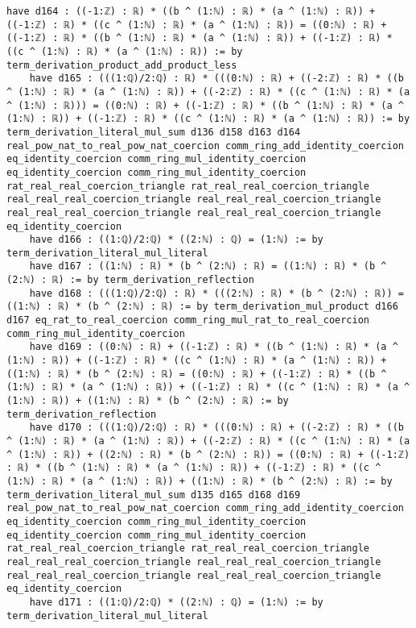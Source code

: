 \documentclass{article}
\begin{document}
\begin{tcolorbox}[colback=white!10, width=\linewidth]
\begin{lstlisting}[language=Lean4]
    have d164 : ((-1:ℤ) : ℝ) * ((b ^ (1:ℕ) : ℝ) * (a ^ (1:ℕ) : ℝ)) + ((-1:ℤ) : ℝ) * ((c ^ (1:ℕ) : ℝ) * (a ^ (1:ℕ) : ℝ)) = ((0:ℕ) : ℝ) + ((-1:ℤ) : ℝ) * ((b ^ (1:ℕ) : ℝ) * (a ^ (1:ℕ) : ℝ)) + ((-1:ℤ) : ℝ) * ((c ^ (1:ℕ) : ℝ) * (a ^ (1:ℕ) : ℝ)) := by term_derivation_product_add_product_less
    have d165 : (((1:ℚ)/2:ℚ) : ℝ) * (((0:ℕ) : ℝ) + ((-2:ℤ) : ℝ) * ((b ^ (1:ℕ) : ℝ) * (a ^ (1:ℕ) : ℝ)) + ((-2:ℤ) : ℝ) * ((c ^ (1:ℕ) : ℝ) * (a ^ (1:ℕ) : ℝ))) = ((0:ℕ) : ℝ) + ((-1:ℤ) : ℝ) * ((b ^ (1:ℕ) : ℝ) * (a ^ (1:ℕ) : ℝ)) + ((-1:ℤ) : ℝ) * ((c ^ (1:ℕ) : ℝ) * (a ^ (1:ℕ) : ℝ)) := by term_derivation_literal_mul_sum d136 d158 d163 d164 real_pow_nat_to_real_pow_nat_coercion comm_ring_add_identity_coercion eq_identity_coercion comm_ring_mul_identity_coercion eq_identity_coercion comm_ring_mul_identity_coercion rat_real_real_coercion_triangle rat_real_real_coercion_triangle real_real_real_coercion_triangle real_real_real_coercion_triangle real_real_real_coercion_triangle real_real_real_coercion_triangle eq_identity_coercion
    have d166 : ((1:ℚ)/2:ℚ) * ((2:ℕ) : ℚ) = (1:ℕ) := by term_derivation_literal_mul_literal
    have d167 : ((1:ℕ) : ℝ) * (b ^ (2:ℕ) : ℝ) = ((1:ℕ) : ℝ) * (b ^ (2:ℕ) : ℝ) := by term_derivation_reflection
    have d168 : (((1:ℚ)/2:ℚ) : ℝ) * (((2:ℕ) : ℝ) * (b ^ (2:ℕ) : ℝ)) = ((1:ℕ) : ℝ) * (b ^ (2:ℕ) : ℝ) := by term_derivation_mul_product d166 d167 eq_rat_to_real_coercion comm_ring_mul_rat_to_real_coercion comm_ring_mul_identity_coercion
    have d169 : ((0:ℕ) : ℝ) + ((-1:ℤ) : ℝ) * ((b ^ (1:ℕ) : ℝ) * (a ^ (1:ℕ) : ℝ)) + ((-1:ℤ) : ℝ) * ((c ^ (1:ℕ) : ℝ) * (a ^ (1:ℕ) : ℝ)) + ((1:ℕ) : ℝ) * (b ^ (2:ℕ) : ℝ) = ((0:ℕ) : ℝ) + ((-1:ℤ) : ℝ) * ((b ^ (1:ℕ) : ℝ) * (a ^ (1:ℕ) : ℝ)) + ((-1:ℤ) : ℝ) * ((c ^ (1:ℕ) : ℝ) * (a ^ (1:ℕ) : ℝ)) + ((1:ℕ) : ℝ) * (b ^ (2:ℕ) : ℝ) := by term_derivation_reflection
    have d170 : (((1:ℚ)/2:ℚ) : ℝ) * (((0:ℕ) : ℝ) + ((-2:ℤ) : ℝ) * ((b ^ (1:ℕ) : ℝ) * (a ^ (1:ℕ) : ℝ)) + ((-2:ℤ) : ℝ) * ((c ^ (1:ℕ) : ℝ) * (a ^ (1:ℕ) : ℝ)) + ((2:ℕ) : ℝ) * (b ^ (2:ℕ) : ℝ)) = ((0:ℕ) : ℝ) + ((-1:ℤ) : ℝ) * ((b ^ (1:ℕ) : ℝ) * (a ^ (1:ℕ) : ℝ)) + ((-1:ℤ) : ℝ) * ((c ^ (1:ℕ) : ℝ) * (a ^ (1:ℕ) : ℝ)) + ((1:ℕ) : ℝ) * (b ^ (2:ℕ) : ℝ) := by term_derivation_literal_mul_sum d135 d165 d168 d169 real_pow_nat_to_real_pow_nat_coercion comm_ring_add_identity_coercion eq_identity_coercion comm_ring_mul_identity_coercion eq_identity_coercion comm_ring_mul_identity_coercion rat_real_real_coercion_triangle rat_real_real_coercion_triangle real_real_real_coercion_triangle real_real_real_coercion_triangle real_real_real_coercion_triangle real_real_real_coercion_triangle eq_identity_coercion
    have d171 : ((1:ℚ)/2:ℚ) * ((2:ℕ) : ℚ) = (1:ℕ) := by term_derivation_literal_mul_literal

\end{lstlisting}
\end{tcolorbox}
\end{document}
